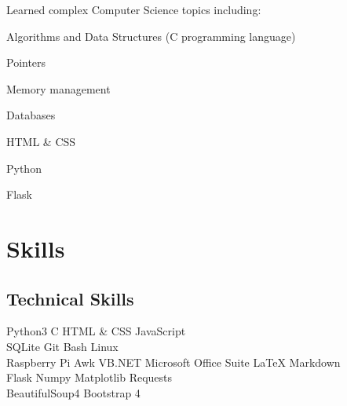 \documentclass[]{deedy-resume-openfont}
\begin{document}
\begin{minipage}[t]{0.33\textwidth}
    Learned complex Computer Science topics including: \\
    \begin{tightemize}
        \item Algorithms and Data Structures (C programming language)
        \item Pointers
        \item Memory management
        \item Databases
        \item HTML \& CSS
        \item Python
        \item Flask
    \end{tightemize}
    \sectionsep



    \section{Skills}
    \subsection{Technical Skills}
    Python3 \textbullet{}   C \textbullet{} HTML \& CSS \textbullet{} JavaScript \\
    SQLite \textbullet{} Git \textbullet{} Bash \textbullet{} Linux \\
    Raspberry Pi \textbullet{} Awk \textbullet{} VB.NET \textbullet{} Microsoft Office Suite \textbullet{} LaTeX \textbullet{} Markdown \\
    \vspace{\topsep} %
    Flask \textbullet{} Numpy \textbullet{} Matplotlib \textbullet{} Requests \\ BeautifulSoup4 \textbullet{} Bootstrap 4 \\
    \sectionsep


\end{minipage}
\end{document}
